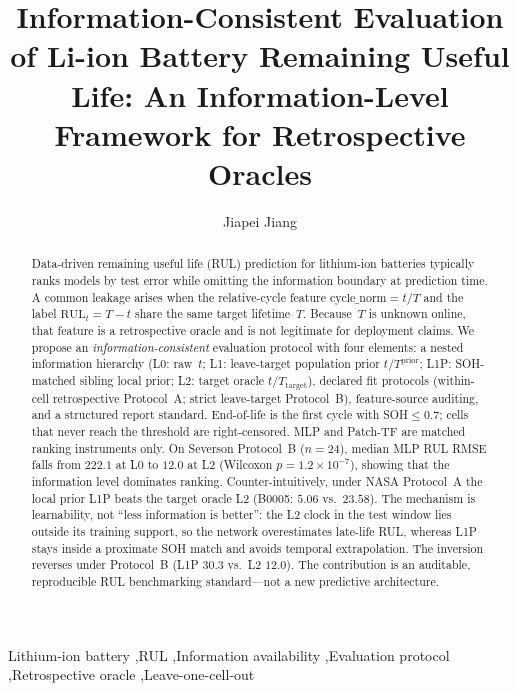 \documentclass[preprint,12pt]{elsarticle}
\begin{document}
\begin{frontmatter}

\title{Information-Consistent Evaluation of Li-ion Battery Remaining Useful Life:
An Information-Level Framework for Retrospective Oracles}

\author[1]{Jiapei Jiang}
\address[1]{School of Business, Guilin University of Electronic Technology, Guilin 541004, China}

\begin{abstract}
Data-driven remaining useful life (RUL) prediction for lithium-ion batteries typically ranks models by test error while omitting the information boundary at prediction time.
A common leakage arises when the relative-cycle feature $\mathrm{cycle\_norm}=t/T$ and the label $\mathrm{RUL}_t=T-t$ share the same target lifetime~$T$.
Because~$T$ is unknown online, that feature is a retrospective oracle and is not legitimate for deployment claims.
We propose an \emph{information-consistent} evaluation protocol with four elements: a nested information hierarchy (L0: raw~$t$; L1: leave-target population prior $t/T^{\mathrm{prior}}$; L1P: SOH-matched sibling local prior; L2: target oracle $t/T_{\mathrm{target}}$), declared fit protocols (within-cell retrospective Protocol~A; strict leave-target Protocol~B), feature-source auditing, and a structured report standard.
End-of-life is the first cycle with SOH$\le 0.7$; cells that never reach the threshold are right-censored.
MLP and Patch-TF are matched ranking instruments only.
On Severson Protocol~B ($n{=}24$), median MLP RUL RMSE falls from $222.1$ at L0 to $12.0$ at L2 (Wilcoxon $p=1.2{\times}10^{-7}$), showing that the information level dominates ranking.
Counter-intuitively, under NASA Protocol~A the local prior L1P beats the target oracle L2 (B0005: $5.06$ vs.\ $23.58$).
The mechanism is learnability, not ``less information is better'': the L2 clock in the test window lies outside its training support, so the network overestimates late-life RUL, whereas L1P stays inside a proximate SOH match and avoids temporal extrapolation.
The inversion reverses under Protocol~B (L1P $30.3$ vs.\ L2 $12.0$).
The contribution is an auditable, reproducible RUL benchmarking standard---not a new predictive architecture.
\end{abstract}

\begin{keyword}
Lithium-ion battery \sep RUL \sep Information availability \sep Evaluation protocol \sep Retrospective oracle \sep Leave-one-cell-out
\end{keyword}

\end{frontmatter}
\end{document}
